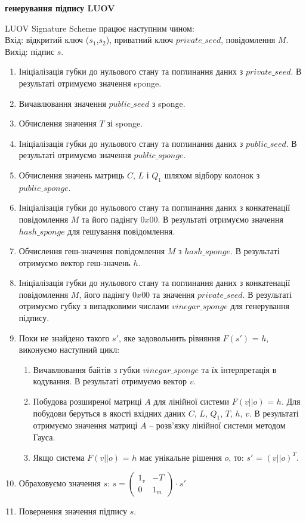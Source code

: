 \vspace{0.25cm}
\textbf{ генерування підпису LUOV}
\vspace{0.25cm}
\begin{algorithm}
    LUOV Signature Scheme працює наступним чином: \\
    Вхід: відкритий ключ ($s_1$,$s_2$), приватний ключ $private\_seed$, повідомлення $M$. \\
    Вихід: підпис $s$.
    \begin{enumerate}
        \item Ініціалізація губки до нульового стану та поглинання даних з $private\_seed$. В результаті отримуємо значення sponge.
        \item Вичавлювання значення $public\_seed$ з sponge.
        \item Обчислення значення $T$ зі sponge.
        \item Ініціалізація губки до нульового стану та поглинання даних з $public\_seed$. В результаті отримуємо значення $public\_sponge$.
        \item Обчислення значень матриць $C$, $L$ і $Q_1$ шляхом відбору колонок з $public\_sponge$.
        \item Ініціалізація губки до нульового стану та поглинання даних з конкатенації повідомлення $M$ та його падінгу $0x00$. В результаті отримуємо значення $hash\_sponge$ для гешування повідомлення.
        \item Обчислення геш-значення повідомлення $M$ з $hash\_sponge$. В результаті отримуємо вектор геш-значень $h$.
        \item Ініціалізація губки до нульового стану та поглинання даних з конкатенації повідомлення $M$, його падінгу $0x00$ та значення $private\_seed$. В результаті отримуємо губку з випадковими числами $vinegar\_sponge$ для генерування підпису.
        \item Поки не знайдено такого $s'$, яке задовольнить рівняння $F(s')$ = $h$, виконуємо наступний цикл:
        \begin{enumerate}
            \item Вичавлювання байтів з губки $vinegar\_sponge$ та їх інтерпретація в кодування. В результаті отримуємо вектор $v$.
            \item Побудова розширеної матриці $A$ для лінійної системи $F(v||o)$ = $h$. Для побудови беруться в якості вхідних даних $C$, $L$, $Q_1$, $T$, $h$, $v$. В результаті отримуємо значення матриці $A$ -- розв'язку лінійної системи методом Гауса.
            \item Якщо система $F(v||o)$ = $h$ має унікальне рішення $o$, то: $s'$ = $(v||o)^T$.
        \end{enumerate}
        \item Обраховуємо значення $s$: 
            $s = \begin{pmatrix}
            1_v & -T \\
            0 & 1_m
            \end{pmatrix} \cdot s'$
        \item Повернення значення підпису $s$.
    \end{enumerate}
\end{algorithm}

